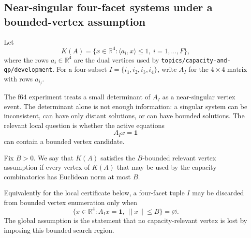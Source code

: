 %
%
%

\providecommand{\R}{\mathbb{R}}
\providecommand{\one}{\mathbf{1}}
\providecommand{\dist}{\operatorname{dist}}
\providecommand{\im}{\operatorname{im}}

\subsection{Near-singular four-facet systems under a bounded-vertex assumption}
\label{sec:f64-near-singular-vertices}

Let
\[
  K(A)=\{x\in\R^4:\langle a_i,x\rangle\le 1,\ i=1,\ldots,F\},
\]
where the rows $a_i\in\R^4$ are the dual vertices used by
\texttt{topics/capacity-and-qp/development}.  For a four-subset
$I=\{i_1,i_2,i_3,i_4\}$, write $A_I$ for the $4\times4$ matrix with rows
$a_{i_j}$.

The f64 experiment treats a small determinant of $A_I$ as a near-singular
vertex event.  The determinant alone is not enough information: a singular
system can be inconsistent, can have only distant solutions, or can have
bounded solutions.  The relevant local question is whether the active equations
\[
  A_Ix=\one
\]
can contain a bounded vertex candidate.

\begin{unverified}
\begin{definition}\label{def:bounded-relevant-vertices}
Fix $B>0$.  We say that $K(A)$ satisfies the $B$-bounded relevant vertex
assumption if every vertex of $K(A)$ that may be used by the capacity
combinatorics has Euclidean norm at most $B$.

Equivalently for the local certificate below, a four-facet tuple $I$ may be
discarded from bounded vertex enumeration only when
\[
  \{x\in\R^4:A_Ix=\one,\ \|x\|\le B\}=\varnothing .
\]
The global assumption is the statement that no capacity-relevant vertex is lost
by imposing this bounded search region.
\end{definition}
\end{unverified}

